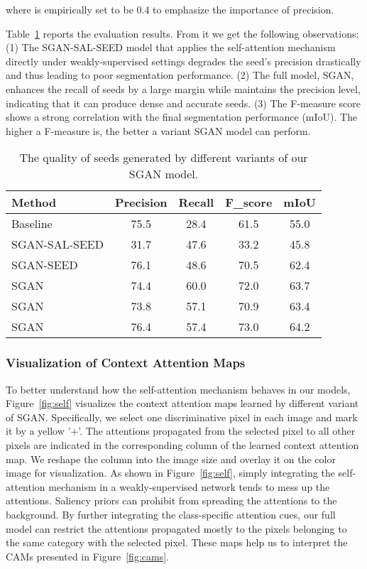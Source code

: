 \documentclass[journal]{IEEEtran}
\begin{document}
where  is empirically set to be 0.4 to emphasize the importance of precision. 

Table~\ref{tab:seed_quality} reports the evaluation results. From it we get the following observations: (1) The SGAN-SAL-SEED model that applies the self-attention mechanism directly under weakly-supervised settings degrades the seed's precision drastically and thus leading to poor segmentation performance. (2) The full model, SGAN, enhances the recall of seeds by a large margin while maintains the precision level, indicating that it can produce dense and accurate seeds. (3) The F-measure score shows a strong correlation with the final segmentation performance (mIoU). The higher a F-measure is, the better a variant SGAN model can perform. 



\begin{table}[htp]
	\caption{The quality of seeds generated by different variants of our SGAN model.}
	\label{tab:seed_quality}
	\centering
	\begin{tabular}{l|c|c|c|c}
		\hline
		Method			&Precision		&Recall	 &F\_score	&mIoU					\\ \hline
		Baseline				&75.5			&28.4		&61.5		&55.0			\\
		SGAN-SAL-SEED		&31.7			&47.6		&33.2		&45.8			  	\\
		SGAN-SEED				&76.1			&48.6			&70.5		&62.4	  	\\
		SGAN			&74.4			&60.0		&72.0		&63.7			\\
		SGAN		&73.8			&57.1		&70.9		&63.4			\\
		SGAN				&76.4			&57.4		&73.0		&64.2				\\ \hline
	\end{tabular}
\end{table}

\subsubsection{Visualization of Context Attention Maps}
To better understand how the self-attention mechanism behaves in our models, Figure~\ref{fig:self} visualizes the context attention maps learned by different variant of SGAN. Specifically, we select one discriminative pixel in each image and mark it by a yellow '+'. The attentions propagated from the selected pixel to all other pixels are indicated in the corresponding column of the learned context attention map. We reshape the column into the image size and overlay it on the color image for visualization. As shown in Figure~\ref{fig:self}, simply integrating the self-attention mechanism in a weakly-supervised network tends to mess up the attentions. Saliency priors can prohibit from spreading the attentions to the background. By further integrating the class-specific attention cues, our full model can restrict the attentions propagated mostly to the pixels belonging to the same category with the selected pixel. These maps help us to interpret the CAMs presented in Figure~\ref{fig:cams}.
\end{document}
